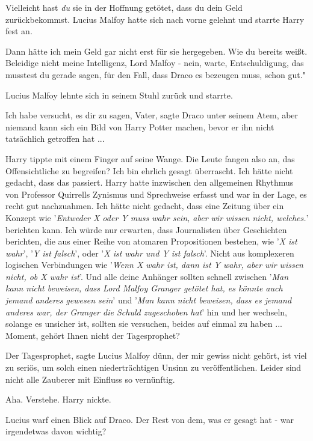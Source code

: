 \glqq Vielleicht hast \emph{du} sie in der Hoffnung getötet, dass du dein Geld
zurückbekommst.\grqq{} Lucius Malfoy hatte sich nach vorne gelehnt und starrte
Harry fest an.

\glqq Dann hätte ich mein Geld gar nicht erst für sie hergegeben. Wie du bereits
weißt. Beleidige nicht meine Intelligenz, Lord Malfoy - nein, warte,
Entschuldigung, das musstest du gerade sagen, für den Fall, dass Draco es
bezeugen muss, schon gut."

Lucius Malfoy lehnte sich in seinem Stuhl zurück und starrte.

\glqq Ich habe versucht, es dir zu sagen, Vater\grqq{}, sagte Draco unter seinem
Atem, \glqq aber niemand kann sich ein Bild von Harry Potter machen, bevor er
ihn nicht tatsächlich getroffen hat ...\grqq{}

Harry tippte mit einem Finger auf seine Wange. \glqq Die Leute fangen also an,
das Offensichtliche zu begreifen? Ich bin ehrlich gesagt überrascht. Ich hätte
nicht gedacht, dass das passiert.\grqq{} Harry hatte inzwischen den allgemeinen
Rhythmus von Professor Quirrells Zynismus und Sprechweise erfasst und war in der
Lage, es recht gut nachzuahmen. \glqq Ich hätte nicht gedacht, dass eine Zeitung
über ein Konzept wie '\emph{Entweder X oder Y muss wahr sein, aber wir wissen
nicht, welches.}' berichten kann. Ich würde nur erwarten, dass Journalisten über
Geschichten berichten, die aus einer Reihe von atomaren Propositionen bestehen,
wie '\emph{X ist wahr}', '\emph{Y ist falsch}', oder '\emph{X ist wahr und Y ist
falsch}'. Nicht aus komplexeren logischen Verbindungen wie '\emph{Wenn X wahr
ist, dann ist Y wahr, aber wir wissen nicht, ob X wahr ist}'. Und alle deine
Anhänger sollten schnell zwischen '\emph{Man kann nicht beweisen, dass Lord
Malfoy Granger getötet hat, es könnte auch jemand anderes gewesen sein}' und
'\emph{Man kann nicht beweisen, dass es jemand anderes war, der Granger die
Schuld zugeschoben hat}' hin und her wechseln, solange es unsicher ist, sollten
sie versuchen, beides auf einmal zu haben ... Moment, gehört Ihnen nicht der
Tagesprophet?\grqq{}

\glqq Der Tagesprophet\grqq{}, sagte Lucius Malfoy dünn, \glqq der mir gewiss
nicht gehört, ist viel zu seriös, um solch einen niederträchtigen Unsinn zu
veröffentlichen. Leider sind nicht alle Zauberer mit Einfluss so
vernünftig.\grqq{}

\glqq Aha. Verstehe.\grqq{} Harry nickte.

Lucius warf einen Blick auf Draco. \glqq Der Rest von dem, was er gesagt hat -
war irgendetwas davon wichtig?\grqq{}


